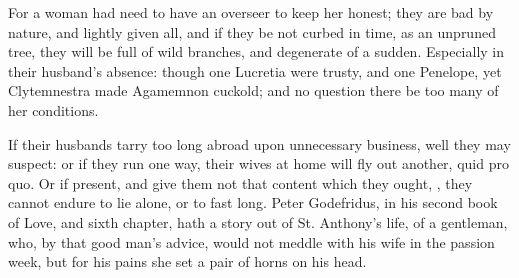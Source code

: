 For a woman had need to have an overseer to keep her honest; they
are bad by nature, and lightly given all, and if they be not curbed in
time, as an unpruned tree, they will be full of wild branches, and
degenerate of a sudden. Especially in their husband's absence: though
one Lucretia were trusty, and one Penelope, yet Clytemnestra made
Agamemnon cuckold; and no question there be too many of her conditions.

If their husbands tarry too long abroad upon unnecessary business, well
they may suspect: or if they run one way, their wives at home will fly
out another, quid pro quo. Or if present, and give them not that
content which they ought, , they cannot endure to lie alone, or to
fast long.  Peter Godefridus, in his second book of Love, and
sixth chapter, hath a story out of St. Anthony's life, of a gentleman,
who, by that good man's advice, would not meddle with his wife in the
passion week, but for his pains she set a pair of horns on his head.

